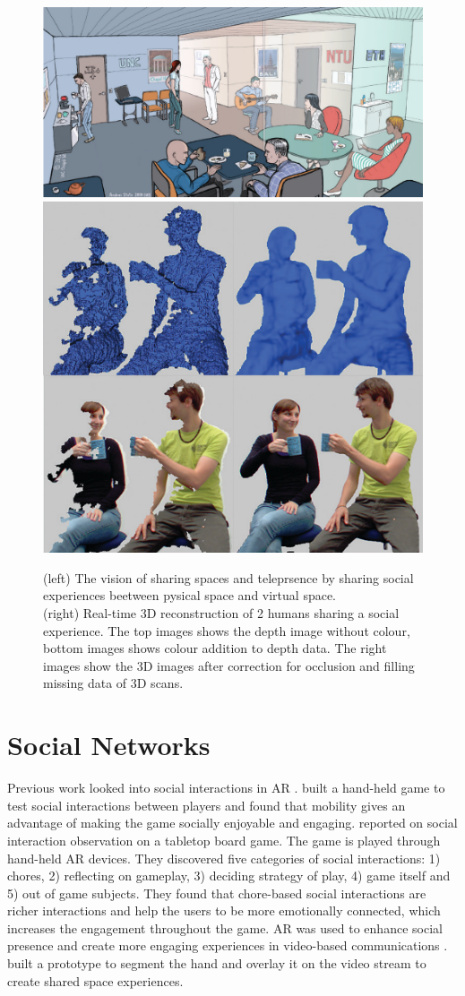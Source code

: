 \begin{figure}
    \centering
    \includegraphics[width=0.6\linewidth]{images/intro/fuchs2014_2.PNG}
    \includegraphics[width=0.35\linewidth]{images/Fuchs2014.PNG}
    \caption{(left) The vision of sharing spaces and teleprsence by sharing social experiences beetween pysical space and virtual space. \\
    (right) Real-time 3D reconstruction of 2 humans sharing a social experience. The top images shows the depth image without colour, bottom images shows colour addition to depth data. The right images show the 3D images after correction for occlusion and filling missing data of 3D scans. \cite{Fuchs2014}}
    \label{fig:Fuchs2014}
\end{figure}


\section{Social Networks}

Previous work looked into social interactions in AR \cite{Schmalstieg_144, Xu2008, Xu2011, Faas2010}. \textcite{Schmalstieg_144} built a hand-held game to test social interactions between players and found that mobility gives an advantage of making the game socially enjoyable and engaging. \textcite{Xu2011} reported on social interaction observation on a tabletop board game. The game is played through hand-held AR devices. They discovered five categories of social interactions: 1) chores, 2) reflecting on gameplay, 3) deciding strategy of play, 4) game itself and 5) out of game subjects. They found that chore-based social interactions are richer interactions and help the users to be more emotionally connected, which increases the engagement throughout the game. AR was used to enhance social presence and create more engaging experiences in video-based communications \cite{Almeida2012}. \textcite{Almeida2012} built a prototype to segment the hand and overlay it on the video stream to create shared space experiences.

